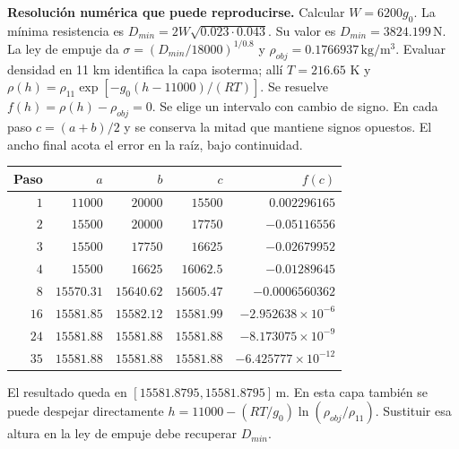\textbf{Resolución numérica que puede reproducirse.} Calcular $W=6200g_0$. La mínima resistencia es $D_{min}=2W\sqrt{0.023\cdot0.043}$. Su valor es $D_{min}=3824.199\,\mathrm N$. La ley de empuje da $\sigma=(D_{min}/18000)^{1/0.8}$ y $\rho_{obj}=0.1766937\,\mathrm{kg/m^3}$. Evaluar densidad en 11 km identifica la capa isoterma; allí $T=216.65$ K y $\rho(h)=\rho_{11}\exp[-g_0(h-11000)/(RT)]$. Se resuelve $f(h)=\rho(h)-\rho_{obj}=0$. Se elige un intervalo con cambio de signo. En cada paso $c=(a+b)/2$ y se conserva la mitad que mantiene signos opuestos. El ancho final acota el error en la raíz, bajo continuidad.
\begin{center}\begin{tabular}{rrrrr}
\toprule Paso & $a$ & $b$ & $c$ & $f(c)$\\\midrule
$1$ & $11000$ & $20000$ & $15500$ & $0.002296165$\\
$2$ & $15500$ & $20000$ & $17750$ & $-0.05116556$\\
$3$ & $15500$ & $17750$ & $16625$ & $-0.02679952$\\
$4$ & $15500$ & $16625$ & $16062.5$ & $-0.01289645$\\
$8$ & $15570.31$ & $15640.62$ & $15605.47$ & $-0.0006560362$\\
$16$ & $15581.85$ & $15582.12$ & $15581.99$ & $-2.952638\times10^{-6}$\\
$24$ & $15581.88$ & $15581.88$ & $15581.88$ & $-8.173075\times10^{-9}$\\
$35$ & $15581.88$ & $15581.88$ & $15581.88$ & $-6.425777\times10^{-12}$\\
\bottomrule\end{tabular}\end{center}
El resultado queda en $[15581.8795,15581.8795]\,\mathrm m$. En esta capa también se puede despejar directamente $h=11000-(RT/g_0)\ln(\rho_{obj}/\rho_{11})$. Sustituir esa altura en la ley de empuje debe recuperar $D_{min}$.
